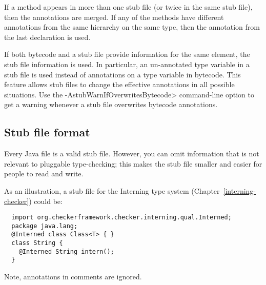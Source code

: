 If a method appears in more than one stub file (or twice in the same
stub file), then the annotations are merged. If any of the
methods have different annotations from the same hierarchy on the same type,
then the annotation from the last declaration is used.


If both bytecode and a stub file provide information for the same
element, the stub file information is used. In particular, an
un-annotated type variable in a stub file is used instead of
annotations on a type variable in bytecode.
This feature allows stub files to change the effective annotations in
all possible situations.
Use the \<-AstubWarnIfOverwritesBytecode> command-line option to get a
warning whenever a stub file overwrites bytecode annotations.


\subsection{Stub file format\label{stub-format}}

Every Java file is a valid stub file.  However, you can omit information
that is not relevant to pluggable type-checking; this makes the stub file
smaller and easier for people to read and write.

As an illustration, a stub file for the Interning type system
(Chapter~\ref{interning-checker}) could be:

\begin{Verbatim}
  import org.checkerframework.checker.interning.qual.Interned;
  package java.lang;
  @Interned class Class<T> { }
  class String {
    @Interned String intern();
  }
\end{Verbatim}

Note, annotations in comments are ignored.

